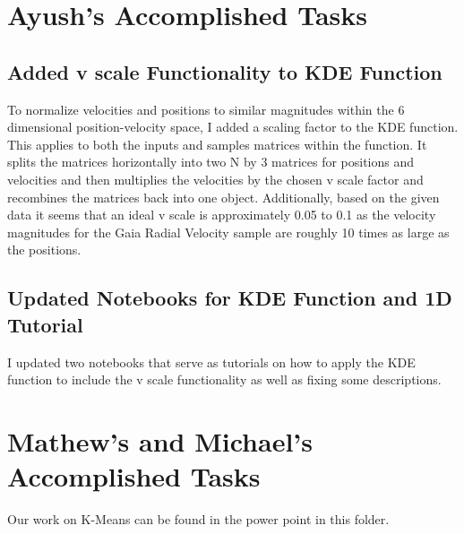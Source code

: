 \documentclass[12pt]{article}
\begin{document}
\section{Ayush’s Accomplished Tasks}
\subsection{Added v scale Functionality to KDE Function}
To normalize velocities and positions to similar magnitudes within the 6 dimensional position-velocity space, I added a scaling factor to the KDE function. This applies to both the inputs and samples matrices within the function. It splits the matrices horizontally into two N by 3 matrices for positions and velocities and then multiplies the velocities by the chosen v scale factor and recombines the matrices back into one object. Additionally, based on the given data it seems that an ideal v scale is approximately 0.05 to 0.1 as the velocity magnitudes for the Gaia Radial Velocity sample are roughly 10 times as large as the positions.

\subsection{Updated Notebooks for KDE Function and 1D Tutorial}
I updated two notebooks that serve as tutorials on how to apply the KDE function to include the v scale functionality as well as fixing some descriptions.

\section{Mathew's and Michael's Accomplished Tasks}
Our work on K-Means can be found in the power point in this folder.
\end{document}
